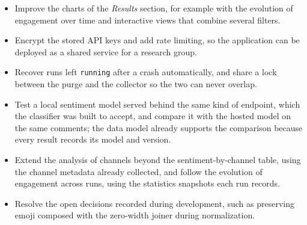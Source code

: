 \begin{itemize}
    \item Improve the charts of the \emph{Results} section, for example with the evolution of engagement over time and interactive views that combine several filters.

    \item Encrypt the stored API keys and add rate limiting, so the application can be deployed as a shared service for a research group.

    \item Recover runs left \texttt{running} after a crash automatically, and share a lock between the purge and the collector so the two can never overlap.

    \item Test a local sentiment model served behind the same kind of endpoint, which the classifier was built to accept, and compare it with the hosted model on the same comments; the data model already supports the comparison because every result records its model and version.

    \item Extend the analysis of channels beyond the sentiment-by-channel table, using the channel metadata already collected, and follow the evolution of engagement across runs, using the statistics snapshots each run records.

    \item Resolve the open decisions recorded during development, such as preserving emoji composed with the zero-width joiner during normalization.
\end{itemize}
